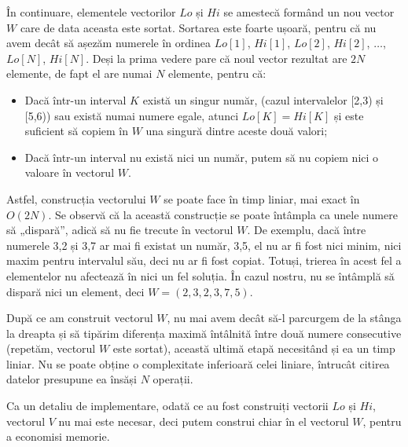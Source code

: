 În continuare, elementele vectorilor $Lo$ și $Hi$ se amestecă formând un nou
vector $W$ care de data aceasta este sortat. Sortarea este foarte ușoară,
pentru că nu avem decât să așezăm numerele în ordinea $Lo[1]$, $Hi[1]$,
$Lo[2]$, $Hi[2]$, $\dots$, $Lo[N]$, $Hi[N]$. Deși la prima vedere pare că noul
vector rezultat are $2N$ elemente, de fapt el are numai $N$ elemente, pentru
că:

\begin{itemize}

\item Dacă într-un interval $K$ există un singur număr, (cazul intervalelor
  [2,3) și [5,6)) sau există numai numere egale, atunci $Lo[K] = Hi[K]$ și
      este suficient să copiem în $W$ una singură dintre aceste două valori;

\item Dacă într-un interval nu există nici un număr, putem să nu copiem nici o
  valoare în vectorul $W$.

\end{itemize}

Astfel, construcția vectorului $W$ se poate face în timp liniar, mai exact în
$O(2N)$. Se observă că la această construcție se poate întâmpla ca unele
numere să „dispară”, adică să nu fie trecute în vectorul $W$. De exemplu, dacă
între numerele 3,2 și 3,7 ar mai fi existat un număr, 3,5, el nu ar fi fost
nici minim, nici maxim pentru intervalul său, deci nu ar fi fost
copiat. Totuși, trierea în acest fel a elementelor nu afectează în nici un fel
soluția. În cazul nostru, nu se întâmplă să dispară nici un element, deci $W =
(2, 3,2, 3,7, 5)$.

După ce am construit vectorul $W$, nu mai avem decât să-l parcurgem de la
stânga la dreapta și să tipărim diferența maximă întâlnită între două numere
consecutive (repetăm, vectorul $W$ este sortat), această ultimă etapă
necesitând și ea un timp liniar. Nu se poate obține o complexitate inferioară
celei liniare, întrucât citirea datelor presupune ea însăși $N$ operații.

Ca un detaliu de implementare, odată ce au fost construiți vectorii $Lo$ și
$Hi$, vectorul $V$ nu mai este necesar, deci putem construi chiar în el
vectorul $W$, pentru a economisi memorie.

